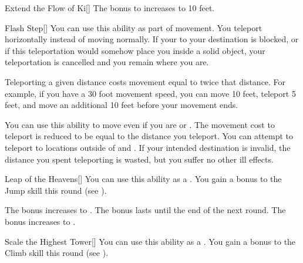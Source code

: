 {\begin{freeability}{Extend the Flow of Ki}[]
                \rankline
                 The bonus to  increases to 10 feet.
            \end{freeability}

            \begin{freeability}{Flash Step}[]
                You can use this ability as part of movement.
                You teleport horizontally instead of moving normally.
                If your  to your destination is blocked, or if this teleportation would somehow place you inside a solid object, your teleportation is cancelled and you remain where you are.

                Teleporting a given distance costs movement equal to twice that distance.
                For example, if you have a 30 foot movement speed, you can move 10 feet, teleport 5 feet, and move an additional 10 feet before your movement ends.

                \rankline
                 You can use this ability to move even if you are  or .
                 The movement cost to teleport is reduced to be equal to the distance you teleport.
                 You can attempt to teleport to locations outside of  and .
                If your intended destination is invalid, the distance you spent teleporting is wasted, but you suffer no other ill effects.
            \end{freeability}

            \begin{freeability}{Leap of the Heavens}[]
                You can use this ability as a .
                You gain a  bonus to the Jump skill this round (see ).

                \rankline
                 The bonus increases to .
                 The bonus lasts until the end of the next round.
                 The bonus increases to .
            \end{freeability}

            \begin{freeability}{Scale the Highest Tower}[]
                You can use this ability as a .
                You gain a  bonus to the Climb skill this round (see ).


\end{freeability}}
